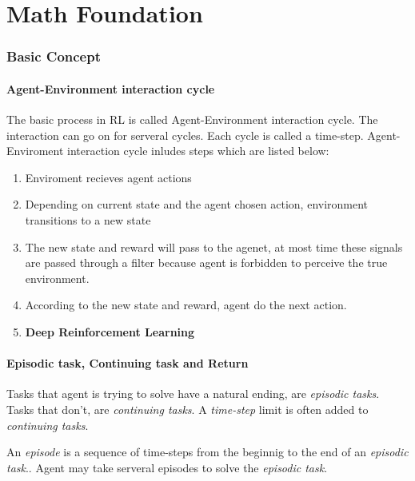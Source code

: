 \part{Math Foundation}
    \section{Basic Concept}
    \subsection{Agent-Environment interaction cycle}
    The basic process in RL is called Agent-Environment interaction cycle. The interaction can go on for serveral cycles. Each cycle is called a time-step. Agent-Enviroment interaction cycle inludes steps which are listed below: 
    \begin{enumerate}
        \item Enviroment recieves agent actions
        \item Depending on current state and the agent chosen action, environment transitions to a new state
        \item The new state and reward will pass to the agenet, at most time these signals are passed through a filter because agent is forbidden to perceive the true environment.
        \item According to the new state and reward, agent do the next action. 
        \item {\bfseries \textcolor{myblue}{Deep Reinforcement Learning}}
    \end{enumerate}

    \subsection{Episodic task, Continuing task and Return}\label{sec:episode}
    Tasks that agent is trying to solve have a natural ending, are {\itshape episodic tasks}. Tasks that don't, are {\itshape continuing tasks}. A {\itshape time-step} limit is often added to {\itshape continuing tasks}. \par

    An \emph{episode} is a sequence of time-steps from the beginnig to the end of an \emph{episodic task}.. Agent may take serveral episodes to solve the {\itshape episodic task}.  \par

